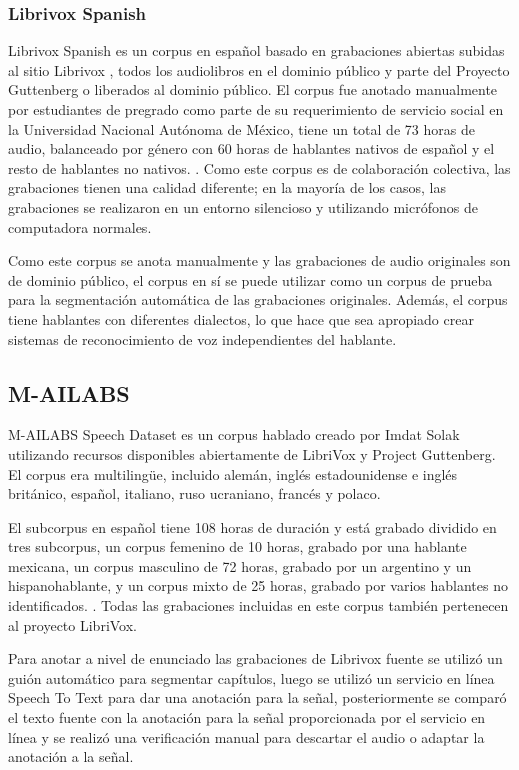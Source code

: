 \documentclass[a4paper,12pt,twoside]{report}
\begin{document}
\subsubsection {Librivox Spanish}

Librivox Spanish es un corpus en español basado en grabaciones abiertas subidas al sitio Librivox \cite{LibriVox}, todos los audiolibros en el dominio público y parte del Proyecto Guttenberg \cite{gutenberg} o liberados al dominio público. El corpus fue anotado manualmente por estudiantes de pregrado como parte de su requerimiento de servicio social en la Universidad Nacional Autónoma de México, tiene un total de 73 horas de audio, balanceado por género con 60 horas de hablantes nativos de español y el resto de hablantes no nativos. . Como este corpus es de colaboración colectiva, las grabaciones tienen una calidad diferente; en la mayoría de los casos, las grabaciones se realizaron en un entorno silencioso y utilizando micrófonos de computadora normales.

Como este corpus se anota manualmente y las grabaciones de audio originales son de dominio público, el corpus en sí se puede utilizar como un corpus de prueba para la segmentación automática de las grabaciones originales. Además, el corpus tiene hablantes con diferentes dialectos, lo que hace que sea apropiado crear sistemas de reconocimiento de voz independientes del hablante.

\subsection{M-AILABS}

M-AILABS Speech Dataset es un corpus hablado creado por Imdat Solak utilizando recursos disponibles abiertamente de LibriVox y Project Guttenberg. El corpus era multilingüe, incluido alemán, inglés estadounidense e inglés británico, español, italiano, ruso ucraniano, francés y polaco.

El subcorpus en español tiene 108 horas de duración y está grabado dividido en tres subcorpus, un corpus femenino de 10 horas, grabado por una hablante mexicana, un corpus masculino de 72 horas, grabado por un argentino y un hispanohablante, y un corpus mixto de 25 horas, grabado por varios hablantes no identificados. . Todas las grabaciones incluidas en este corpus también pertenecen al proyecto LibriVox.

Para anotar a nivel de enunciado las grabaciones de Librivox fuente se utilizó un guión automático para segmentar capítulos, luego se utilizó un servicio en línea Speech To Text para dar una anotación para la señal, posteriormente se comparó el texto fuente con la anotación para la señal proporcionada por el servicio en línea y se realizó una verificación manual para descartar el audio o adaptar la anotación a la señal.
\end{document}
